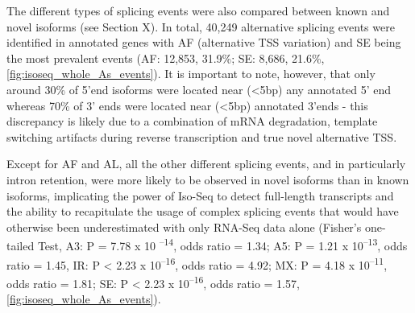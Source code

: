 The different types of splicing events were also compared between known and novel isoforms (see Section X). In total, 40,249 alternative splicing events were identified in annotated genes with AF (alternative TSS variation) and SE being the most prevalent events (AF: 12,853, 31.9\%; SE: 8,686, 21.6\%, \cref{fig:isoseq_whole_As_events}). It is important to note, however, that only around 30\% of 5'end isoforms were located near (<5bp) any annotated 5' end whereas 70\% of 3' ends were located near (<5bp) annotated 3'ends - this discrepancy is likely due to a combination of mRNA degradation, template switching artifacts during reverse transcription and true novel alternative TSS. 

Except for AF and AL, all the other different splicing events, and in particularly intron retention, were more likely to be observed in novel isoforms than in known isoforms, implicating the power of Iso-Seq to detect full-length transcripts and the ability to recapitulate the usage of complex splicing events that would have otherwise been underestimated with only RNA-Seq data alone (Fisher's one-tailed Test, A3: P = 7.78 x 10 \textsuperscript{–14}, odds ratio = 1.34; A5: P = 1.21 x 10\textsuperscript{–13}, odds ratio = 1.45, IR: P < 2.23 x 10\textsuperscript{–16}, odds ratio = 4.92; MX: P = 4.18 x 10\textsuperscript{–11}, odds ratio = 1.81; SE: P < 2.23 x 10\textsuperscript{–16}, odds ratio = 1.57, \cref{fig:isoseq_whole_As_events}). 

